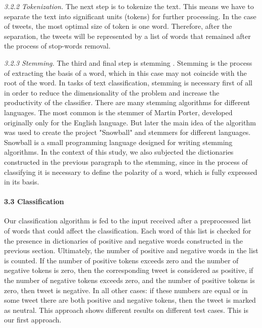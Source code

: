 \textit{3.2.2 Tokenization.} The next step is to tokenize the text. This means we have to separate the text into significant units (tokens) for further processing. In the case of tweets, the most optimal size of token is one word. Therefore, after the separation, the tweets will be represented by a list of words that remained after the process of stop-words removal.

\textit{3.2.3 Stemming.} The third and final step is stemming \cite{SavoyDolamic}. Stemming is the process of extracting the basis of a word, which in this case may not coincide with the root of the word. In tasks of text classification, stemming is necessary first of all in order to reduce the dimensionality of the problem and increase the productivity of the classifier. There are many stemming algorithms for different languages. The most common is the stemmer of Martin Porter, developed originally only for the English language. But later the main idea of the algorithm was used to create the project "Snowball" and stemmers for different languages. Snowball is a small programming language designed for writing stemming algorithms. In the context of this study, we also subjected the dictionaries constructed in the previous paragraph to the stemming, since in the process of classifying it is necessary to define the polarity of a word, which is fully expressed in its basis.

\paragraph{3.3 Classification}
Our classification algorithm is fed to the input received after a preprocessed list of words that could affect the classification. Each word of this list is checked for the presence in dictionaries of positive and negative words constructed in the previous section. Ultimately, the number of positive and negative words in the list is counted. If the number of positive tokens exceeds zero and the number of negative tokens is zero, then the corresponding tweet is considered as positive, if the number of negative tokens exceeds zero, and the number of positive tokens is zero, then tweet is negative. In all other cases: if these numbers are equal or in some tweet there are both positive and negative tokens, then the tweet is marked as neutral. This approach shows different results on different test cases. This is our first approach.


